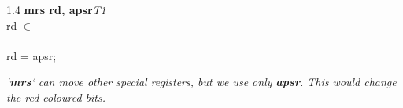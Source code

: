 


\begin{instructionblock}{1.4\imagewidth}%
\textbf{mrs rd, apsr}\hfill\textit{T1}\\
    rd $\in$ \extendedregisters\\
    {}\\
    rd = apsr;\vspace{0.5em}

    \itshape
    `\textbf{mrs}` can move other special registers, but we use only
    \textbf{apsr}.
    This would change the red coloured bits.
\end{instructionblock}

